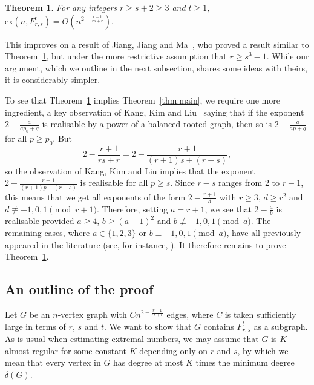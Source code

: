 \documentclass[11pt]{article}
\numberwithin{equation}{section}
\newtheorem{theorem}{\bf Theorem}[section]
\theoremstyle{definition}
\def\ex{\mathrm{ex}}
\begin{document}
\begin{theorem} \label{thm:main2}
	For any integers $r\geq s+2\geq 3$ and $t\geq 1$, $\ex(n,F_{r,s}^t)=O(n^{2-\frac{r+1}{rs+r}}).$
\end{theorem}

This improves on a result of Jiang, Jiang and Ma~\cite{JJM20}, who proved a result similar to Theorem~\ref{thm:main2}, but under the more restrictive assumption that $r \geq s^3 - 1$. While our argument, which we outline in the  next subsection, shares some ideas with theirs, it is considerably simpler.

To see that Theorem~\ref{thm:main2} implies Theorem~\ref{thm:main}, we require one more ingredient, a key observation of Kang, Kim and Liu~\cite{KKL18} saying that if the exponent $2 - \frac{a}{a p_0 +q}$ is realisable by a power of a balanced rooted graph, then so is $2 - \frac{a}{ap+q}$ for all $p \geq p_0$. But
\[2 - \frac{r+1}{rs+r} = 2 - \frac{r+1}{(r+1)s +(r- s)},\]
so the observation of Kang, Kim and Liu implies that the exponent $2 - \frac{r+1}{(r+1)p + (r- s)}$ is realisable for  all $p \geq s$. Since $r- s$ ranges from $2$ to $r-1$, this means that we get all exponents of the form $2 - \frac{r+1}{d}$ with $r \geq 3$, $d \geq r^2$ 
and $d \not\equiv -1, 0, 1 \pmod{r+1}$. 
Therefore, setting $a = r+1$, we see that $2 - \frac{a}{b}$ is realisable provided $a \geq 4$, $b \geq (a-1)^2$ and $b \not\equiv -1, 0, 1 \pmod{a}$. 
The remaining cases, where $a \in \{1, 2, 3\}$ or $b \equiv -1, 0, 1 \pmod{a}$, have all previously appeared in the literature (see, for instance,  \cite{KKL18}). 
It therefore remains to prove Theorem~\ref{thm:main2}.
    









\subsection{An outline of the proof}

Let $G$ be an $n$-vertex graph with $Cn^{2-\frac{r+1}{rs+r}}$ edges, where $C$ is taken sufficiently large in terms of $r$, $s$ and $t$. We want to show that $G$ contains $F_{r,s}^t$ as a subgraph. As is usual when estimating extremal numbers, we may assume that $G$ is $K$-almost-regular for some constant $K$ depending only on $r$ and $s$, by which we mean that every vertex in $G$ has degree at most $K$ times the minimum degree $\delta(G)$.
\end{document}
